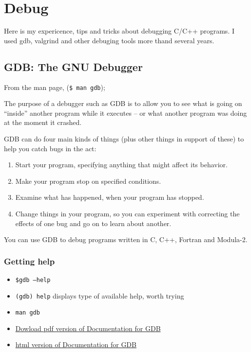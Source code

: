 \chapter{Debug}
Here is my expericence, tips and tricks about debugging C/C++ programs.
I used gdb, valgrind and other debuging tools more thand several years.

\section{GDB: The GNU Debugger}



From the man page, (\texttt{\$ man gdb});

The purpose of a debugger such as GDB is to allow you to see what is going on ``inside'' another program while it executes -- or what another program was doing at the moment it crashed.

GDB can do four main kinds of things (plus other things in support of these) to help you catch bugs in the act:

\begin{enumerate}
  \item Start your program, specifying anything that might affect its behavior.
  \item Make your program stop on specified conditions.
  \item Examine what has happened, when your program has stopped.
  \item Change things in your program, so you can experiment with correcting the effects of one bug and go on to learn about another.
\end{enumerate}

You can use GDB to debug programs written in C, C++, Fortran and Modula-2.



\subsection{Getting help}
\begin{itemize}
  \item \texttt{\$gdb --help} \\
  \item \texttt{(gdb) help}
    displays type of available help, worth trying
  \item \texttt{man gdb}
  \item \href{https://sourceware.org/gdb/download/onlinedocs/}{Dowload pdf version of Documentation for GDB}
  \item \href{https://developer.apple.com/library/archive/documentation/DeveloperTools/gdb/gdb/gdb_toc.html}{html version of Documentation for GDB}

\end{itemize}


